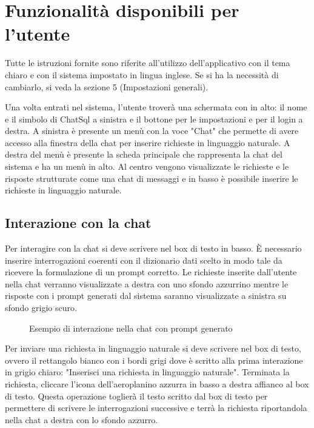 \section{Funzionalità disponibili per l'utente}
\label{sec:sezUtente}

Tutte le istruzioni fornite sono riferite all'utilizzo dell'applicativo con il tema chiaro e con il sistema impostato in lingua inglese. Se si ha la necessità di cambiarlo, si veda la sezione 5 (Impostazioni generali).

Una volta entrati nel sistema, l'utente troverà una schermata con in alto: il nome e il simbolo di ChatSql a sinistra e il bottone per le impostazioni e per il login a destra. A sinistra è presente un menù con la voce "Chat" che permette di avere accesso alla finestra della chat per inserire richieste in linguaggio naturale. A destra del menù è presente la scheda principale che rappresenta la chat del sistema e ha un menù in alto. Al centro vengono visualizzate le richieste e le risposte strutturate come una chat di messaggi e in basso è possibile inserire le richieste in linguaggio naturale.

\subsection{Interazione con la chat}

Per interagire con la chat si deve scrivere nel box di testo in basso. È necessario inserire interrogazioni coerenti con il dizionario dati scelto in modo tale da ricevere la formulazione di un prompt corretto. Le richieste inserite dall'utente nella chat verranno visualizzate a destra con uno sfondo azzurrino mentre le risposte con i prompt generati dal sistema saranno visualizzate a sinistra su sfondo grigio scuro.

\begin{figure}[H]
  \centering
  \caption{Esempio di interazione nella chat con prompt generato}
\end{figure}

Per inviare una richiesta in linguaggio naturale si deve scrivere nel box di testo, ovvero il rettangolo bianco con i bordi grigi dove è scritto alla prima interazione in grigio chiaro: "Inserisci una richiesta in linguaggio naturale". Terminata la richiesta, cliccare l'icona dell'aeroplanino azzurra in basso a destra affianco al box di testo. Questa operazione toglierà il testo scritto dal box di testo per permettere di scrivere le interrogazioni successive e terrà la richiesta riportandola nella chat a destra con lo sfondo azzurro.

